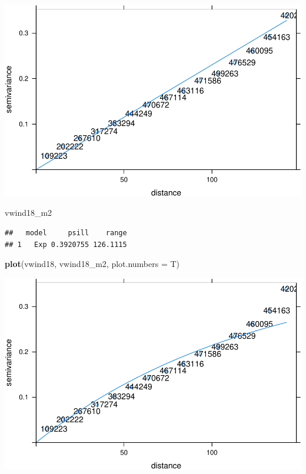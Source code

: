\documentclass[11pt,]{article}
\newenvironment{Shaded}{\begin{snugshade}}{\end{snugshade}}
\newcommand{\KeywordTok}[1]{\textcolor[rgb]{0.13,0.29,0.53}{\textbf{#1}}}
\newcommand{\DataTypeTok}[1]{\textcolor[rgb]{0.13,0.29,0.53}{#1}}
\newcommand{\NormalTok}[1]{#1}
\begin{document}
\includegraphics{proyecto_files/figure-latex/unnamed-chunk-42-2.pdf}

\begin{Shaded}
\begin{Highlighting}[]
\NormalTok{vwind18_m2}
\end{Highlighting}
\end{Shaded}

\begin{verbatim}
##   model     psill    range
## 1   Exp 0.3920755 126.1115
\end{verbatim}

\begin{Shaded}
\begin{Highlighting}[]
\KeywordTok{plot}\NormalTok{(vwind18, vwind18_m2, }\DataTypeTok{plot.numbers =}\NormalTok{ T)}
\end{Highlighting}
\end{Shaded}

\includegraphics{proyecto_files/figure-latex/unnamed-chunk-42-3.pdf}
\end{document}
